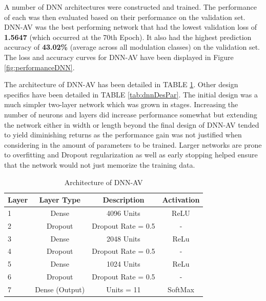 \documentclass[journal,onecolumn]{IEEEtran}
\begin{document}
A number of DNN architectures were constructed and trained. The performance of each was then evaluated based on their performance on the validation set. DNN-AV was the best performing network that had the lowest validation loss of \textbf{1.5647} (which occurred at the 70th Epoch). It also had the highest prediction accuracy of \textbf{43.02\%} (average across all modulation classes) on the validation set. The loss and accuracy curves for DNN-AV have been displayed in Figure \ref{fig:performanceDNN}. 

The architecture of DNN-AV has been detailed in TABLE \ref{tab:dnn-arch}. Other design specifics have been detailed in TABLE \ref{tab:dnnDesPar}. The initial design was a much simpler two-layer network which was grown in stages. Increasing the number of neurons and layers did increase performance somewhat but extending the network either in width or length beyond the final design of DNN-AV tended to yield diminishing returns as the performance gain was not justified when considering in the amount of parameters to be trained. Larger networks are prone to overfitting and Dropout regularization as well as early stopping helped ensure that the network would not just memorize the training data.

\begin{table}[]
\centering
\caption{Architecture of DNN-AV}
\label{tab:dnn-arch}
\begin{tabular}{lccc}
\hline
Layer & Layer Type & Description        & Activation \\ \hline
1     & Dense      & 4096 Units         & ReLU       \\
2     & Dropout    & Dropout Rate = 0.5 & -          \\
3     & Dense      & 2048 Units         & ReLu       \\
4     & Dropout    & Dropout Rate = 0.5 & -          \\
5     & Dense      & 1024 Units         & ReLu       \\
6     & Dropout    & Dropout Rate = 0.5 & -          \\
7     & Dense (Output)      & Units = 11         & SoftMax    \\ \hline
\end{tabular}
\end{table}
\end{document}
